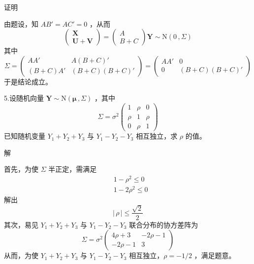 \documentclass[12pt,hyperref,]{ctexart}
\begin{document}
\vspace{1em}

\heiti

证明

\songti

由题设，知 \(AB'=AC'=0\) ，从而 \begin{equation*}
\begin{pmatrix}
\boldsymbol{X} \\
\boldsymbol{U}+\boldsymbol{V}
\end{pmatrix} = 
\begin{pmatrix}
A \\
B+C
\end{pmatrix}\boldsymbol{Y}\sim\mathrm{N}(0\, ,\Sigma)
\end{equation*}其中 \begin{equation*}
\Sigma=
\begin{pmatrix}
AA' & A(B+C)' \\
(B+C)A' & (B+C)(B+C)'
\end{pmatrix}=
\begin{pmatrix}
AA' & 0 \\
0 & (B+C)(B+C)'
\end{pmatrix}
\end{equation*}于是结论成立。

\vspace{3em}

\kaishu

5.设随机向量
\(\boldsymbol{Y}\sim \mathrm{N}(\boldsymbol{\mu}\, ,\Sigma)\) ，其中
\begin{equation*}
\Sigma=\sigma^2
\begin{pmatrix}
1 & \rho & 0 \\
\rho & 1 & \rho \\
0 & \rho & 1
\end{pmatrix}
\end{equation*}已知随机变量 \(Y_1+Y_2+Y_3\) 与 \(Y_1-Y_2-Y_3\)
相互独立，求 \(\rho\) 的值。

\vspace{1em}

\heiti

解

\songti

首先，为使 \(\Sigma\) 半正定，需满足 \begin{equation*}
\begin{aligned}
& 1-\rho^2\le 0 \\
& 1-2\rho^2 \le 0
\end{aligned}
\end{equation*}解出 \begin{equation*}
|\, \rho\, |\le \frac{\sqrt{2}}{2}
\end{equation*}其次，易见 \(Y_1+Y_2+Y_3\) 与 \(Y_1-Y_2-Y_3\)
联合分布的协方差阵为 \begin{equation*}
\Sigma=\sigma^2
\begin{pmatrix}
4\rho +3 & -2\rho -1 \\
-2\rho -1 & 3 
\end{pmatrix}
\end{equation*}从而，为使 \(Y_1+Y_2+Y_3\) 与 \(Y_1-Y_2-Y_3\)
相互独立，\(\rho=-1/2\) ，满足题意。
\end{document}
